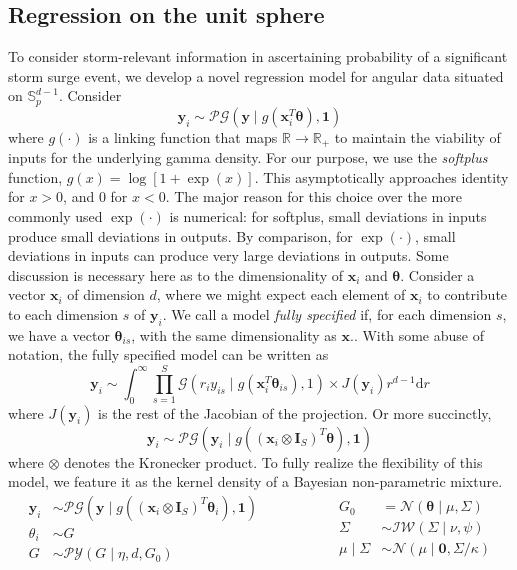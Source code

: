 \subsection{Regression on the unit sphere\label{ref:regression}}
To consider storm-relevant information in ascertaining probability of a significant storm surge event, 
    we develop a novel regression model for angular data situated on $\mathbb{S}_p^{d-1}$.  Consider
    \[
        \bm{y}_i \sim \mathcal{PG}(\bm{y}\mid g(\bm{x}_i^T\bm{\theta}), \bm{1})    
    \]
    where $g(\cdot)$ is a linking function that maps $\mathbb{R}\to\mathbb{R}_+$ to maintain the
    viability of inputs for the underlying gamma density.  For our purpose, we use the \emph{softplus}
    function, $g(x) = \log[1 + \exp(x)]$.  This asymptotically approaches identity for $x > 0$, and 
    0 for $x < 0$. The major reason for this choice over the more commonly used $\exp(\cdot)$ is 
    numerical: for softplus, small deviations in inputs produce small deviations in outputs.  By 
    comparison, for $\exp(\cdot)$, small deviations in inputs can produce very large deviations in 
    outputs.  Some discussion is necessary here as to the dimensionality of $\bm{x}_i$ and $\bm{\theta}$.  
    Consider a vector $\bm{x}_i$ of dimension $d$, where we might expect each element of $\bm{x}_i$ 
    to contribute to each dimension $s$ of $\bm{y}_i$.  We call a model \emph{fully specified} if, 
    for each dimension $s$, we have a vector $\bm{\theta}_{is}$, with the same dimensionality as 
    $\bm{x}$.. With some abuse of notation, the fully specified model can be written as
    \[
        \bm{y}_i \sim \int_0^{\infty}
            \prod_{s = 1}^S \mathcal{G}\left(r_iy_{is}\mid 
                g(\bm{x}_i^T\bm{\theta}_{is}), 1\right) \times J(\bm{y}_i) r^{d-1}\text{d}r
    \]
    where $J(\bm{y}_i)$ is the rest of the Jacobian of the projection.  Or more succinctly, 
    \[
        \bm{y}_i \sim \mathcal{PG}\left(\bm{y}_i \mid g((\bm{x}_i 
            \otimes \bm{I}_{S})^T\bm{\theta}), \bm{1}\right)
    \]
    where $\otimes$ denotes the Kronecker product.  To fully realize the flexibility of this model,
    we feature it as the kernel density of a Bayesian non-parametric mixture.
    \begin{equation}
        \label{eqn:regressionmodel}
        \begin{aligned}
            \bm{y}_i &\sim \mathcal{PG}\left(\bm{y}\mid 
                g\left((\bm{x}_i\otimes\bm{I}_S)^T\bm{\theta}_i\right), \bm{1}\right)\\
            \theta_i &\sim G\\
            G &\sim \mathcal{PY}(G\mid\eta, d, G_0)
        \end{aligned}
        ~\hspace{2cm}
        \begin{aligned}
            G_0 &= \mathcal{N}(\bm{\theta} \mid \mu, \Sigma)\\
            \Sigma &\sim \mathcal{IW}(\Sigma\mid \nu, \psi)\\
            \mu\mid\Sigma &\sim \mathcal{N}(\mu\mid \bm{0}, \Sigma / \kappa)
        \end{aligned}
    \end{equation}
